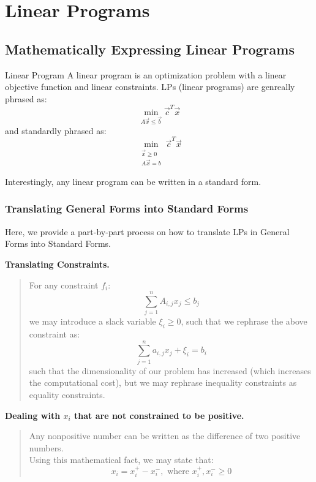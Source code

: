 \chapter{Linear Programs}

\section{Mathematically Expressing Linear Programs}
\begin{ln-define}{Linear Program}{}
    A linear program is an optimization problem with a linear objective function and linear constraints.
    \tcblower
    LPs (linear programs) are genreally phrased as:
    \[
        \min_{A \vec{x} \leq \vec{b}} \vec{c}^T \vec{x}
    \]
    and standardly phrased as:
    \[
        \min_{
            \substack{
                \vec{x} \geq 0 \\
                A \vec{x} = b
            }
        } \vec{c}^T \vec{x}
    \]
\end{ln-define}
Interestingly, any linear program can be written in a standard form.

\subsection{Translating General Forms into Standard Forms}
Here, we provide a part-by-part process on how to translate LPs in General Forms into Standard Forms.

\textbf{Translating Constraints.}
\begin{quote}
    For any constraint $f_i$:
    \[
        \sum_{j = 1}^n A_{i,j} x_j \leq b_j
    \]
    we may introduce a slack variable $\xi_i \geq 0$, such that we rephrase the above constraint as:
    \[
        \sum_{j = 1}^n a_{i,j} x_j + \xi_i = b_i
    \]
    such that the dimensionality of our problem has increased (which increases the computational cost), but we may rephrase inequality constraints as equality constraints.
\end{quote}

\textbf{Dealing with $x_i$ that are not constrained to be positive.}
\begin{quote}
    Any nonpositive number can be written as the difference of two positive numbers. \\
    Using this mathematical fact, we may state that:
    \[
        x_i = x_i^+ - x_i^-, \text{ where } x_i^+, x_i^- \geq 0
    \]
\end{quote}

